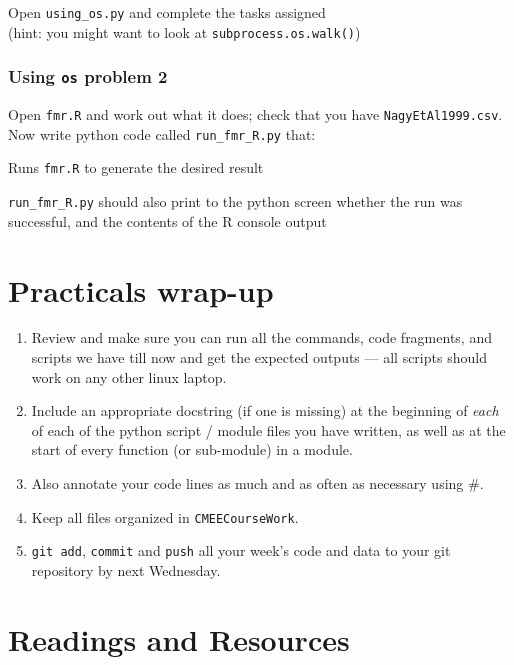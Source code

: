 	Open {\tt using\_os.py} and complete the tasks assigned \\
	(hint: you might want to look at {\tt subprocess.os.walk()})
	
\subsubsection{Using {\tt os} problem 2}
	
	 Open {\tt fmr.R} and work out what it does; check that you have 
	{\tt NagyEtAl1999.csv}. Now write python code called 
		{\tt run\_fmr\_R.py} that:
	\begin{compactitem} \itemsep2pt
		\item Runs {\tt fmr.R} to generate the desired result
		\item {\tt run\_fmr\_R.py} should also print to the python screen 
		whether the run was successful, and the contents of the R console 
		output
	\end{compactitem}

\section{Practicals wrap-up}

  \begin{enumerate}

	\item Review and make sure you can run all the commands, code 
	fragments, and scripts we have till now and get the expected outputs 
	---  all scripts should work on any other linux laptop.
	
	\item Include an appropriate docstring (if one is missing) at the 
	beginning of {\it each} of each of the python script / module files 
	you have written, as well as at the start of every function (or 
	sub-module) in a module.

	\item Also annotate your code lines as much and as often as necessary 
	using \#.
	
	\item Keep all files organized in {\tt CMEECourseWork}.
	
	\item {\tt git add}, {\tt commit} and {\tt push} all your week's  code 
	and data to your git repository by next Wednesday. 
	 
   \end{enumerate}
	
\section{Readings and Resources}

